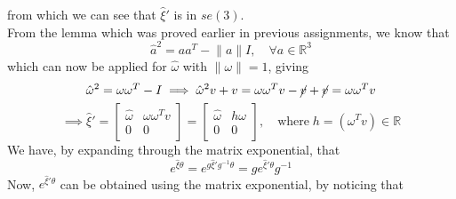 from which we can see that \( \hat{\xi}' \) is in \( se(3) \).\\
From the lemma which was proved earlier in previous assignments, we know that
\begin{equation*}
      {\hat{a}}^2 = a a^T - \lVert a \rVert I, \quad \forall a \in \mathbb{R}^3
\end{equation*}
which can now be applied for \( \hat \omega \) with \( \lVert \omega \rVert = 1 \), giving
\begin{equation*}
      {\hat{\omega}}^2
      =
      \omega \omega^T - I
      \implies
      {\hat{\omega}}^2 v + v
      =
      \omega \omega^T v - \cancel{v} + \cancel{v}
      =
      \omega \omega^T v
\end{equation*}
\begin{equation*}
      \implies
      \hat{\xi}'
      =
      \begin{bmatrix}
            \hat \omega & \omega \omega^T v \\
            0           & 0
      \end{bmatrix}
      =
      \begin{bmatrix}
            \hat \omega & h \omega \\
            0           & 0
      \end{bmatrix},
      \quad \text{where} \; h = (\omega^T v) \in \mathbb{R}
\end{equation*}
We have, by expanding through the matrix exponential, that
\begin{equation*}
      e^{\hat{\xi} \theta}
      =
      e^{g \hat{\xi}' g^{-1} \theta}
      =
      g e^{\hat{\xi}' \theta} g^{-1}
\end{equation*}
Now, \( e^{\hat{\xi}' \theta} \) can be obtained using the matrix exponential, by noticing that
